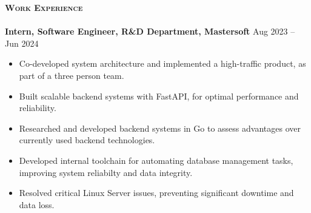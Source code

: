 \documentclass[a4paper]{article}
\newcommand{\lineunder} {
\vspace*{-8pt} \\
\hspace*{-18pt} \hrulefill \\
}
\newcommand{\header}[1]{%
{\hspace*{-18pt}\vspace*{6pt} \textsc{\textbf{\Large{#1}}}}%
\vspace*{-6pt} \lineunder
}
\begin{document}
\header{Work Experience}
\vspace{1mm}
\textbf{Intern, Software Engineer, R\&D Department, Mastersoft} \hfill Aug 2023 -- Jun 2024 \\
\vspace{-1mm}
\begin{itemize}

    \item Co-developed system architecture and implemented a high-traffic product,
    as part of a three person team. \\
    \item Built scalable backend systems with FastAPI,
    for optimal performance and reliability. \\
    \item Researched and developed backend systems in Go to assess advantages
    over currently used backend technologies. \\
    \item Developed internal toolchain for automating database management tasks,
    improving system reliabilty and data integrity. \\
    \item Resolved critical Linux Server issues, 
    preventing significant downtime and data loss. \\

\end{itemize}
\end{document}
